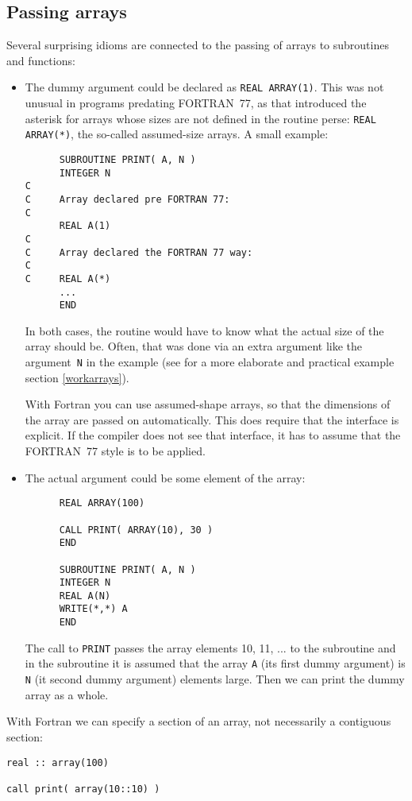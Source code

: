 \subsection{Passing arrays}
\label{passingarrays}
Several surprising idioms are connected to the passing of arrays to subroutines
and functions:
\begin{itemize}
\item
The dummy argument could be declared as \verb+REAL ARRAY(1)+. This was not
unusual in programs predating FORTRAN~77, as that introduced the asterisk for
arrays whose sizes are not defined in the routine perse: \verb+REAL ARRAY(*)+, the
so-called assumed-size arrays. A small example:
\begin{verbatim}
      SUBROUTINE PRINT( A, N )
      INTEGER N
C
C     Array declared pre FORTRAN 77:
C
      REAL A(1)
C
C     Array declared the FORTRAN 77 way:
C
C     REAL A(*)
      ...
      END
\end{verbatim}

In both cases, the routine would have to know what the actual size of the array
should be. Often, that was done via an extra argument like the argument~\verb+N+
in the example (see for a more elaborate and practical example section \ref{workarrays}).

With Fortran you can use assumed-shape arrays, so that the dimensions of the array
are passed on automatically. This does require that the interface is explicit. If the
compiler does not see that interface, it has to assume that the FORTRAN~77 style is
to be applied.

\item
The actual argument could be some element of the array:
\begin{verbatim}
      REAL ARRAY(100)

      CALL PRINT( ARRAY(10), 30 )
      END

      SUBROUTINE PRINT( A, N )
      INTEGER N
      REAL A(N)
      WRITE(*,*) A
      END
\end{verbatim}

The call to \verb+PRINT+ passes the array elements 10, 11, ... to the subroutine
and in the subroutine it is assumed that the array \verb+A+ (its first dummy argument)
is \verb+N+ (it second dummy argument) elements large. Then we can print the dummy array
as a whole.
\end{itemize}

With Fortran we can specify a section of an array, not necessarily a contiguous section:
\begin{verbatim}
real :: array(100)

call print( array(10::10) )
\end{verbatim}

